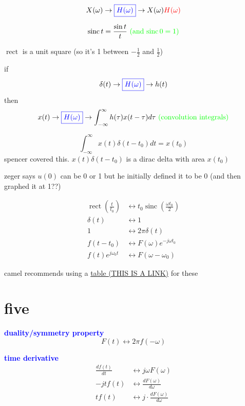 \documentclass[a5paper, fleqn]{article}
\newcommand{\vocab}[1]{\textbf{\textcolor{blue}{#1}}}
\newcommand{\emf}[1]{\textcolor{red}{#1}}
\newcommand{\note}[1]{\textcolor{green}{#1}}
\DeclareMathOperator{\sinc}{sinc}
\DeclareMathOperator{\rect}{rect}
\begin{document}
\[X(\omega) \to \vocab{$\boxed{H(\omega)}$} \to X(\omega) \emf{H(\omega)}\]

\[\sinc t = \frac{\sin t}{t} ~ \note{\text{(and $\sinc 0 = 1$)}}\]

$\rect$ is a unit square (so it's 1 between $-\frac{1}{2}$ and $\frac{1}{2}$)

if
\[\delta(t) \to \vocab{$\boxed{H(\omega)}$} \to h(t)\]
then
\[x(t) \to \vocab{$\boxed{H(\omega)}$} \to \int_{-\infty}^\infty h(\tau) x(t - \tau) d\tau ~ \note{\text{(convolution integrals)}}\]

\[\int_{-\infty}^\infty x(t) \delta(t - t_0) dt = x(t_0)\]
spencer covered this. $x(t) \delta(t - t_0)$ is a dirac delta with area $x(t_0)$

zeger says $u(0)$ can be 0 or 1 but he initially defined it to be 0 (and then graphed it at 1??)

\begin{align*}
  \rect(\frac{t}{t_0})  & \leftrightarrow t_0 \sinc(\frac{\omega t_0}{2}) \\
  \delta(t)             & \leftrightarrow 1                               \\
  1                     & \leftrightarrow 2 \pi \delta(t)                 \\
  f(t - t_0)            & \leftrightarrow F(\omega) e^{-j\omega t_0}      \\
  f(t) e^{j \omega_0 t} & \leftrightarrow F(\omega - \omega_0)
\end{align*}

camel recommends using a \href{https://ethz.ch/content/dam/ethz/special-interest/baug/ibk/structural-mechanics-dam/education/identmeth/fourier.pdf}{table (THIS IS A LINK)} for these

\section*{\textcolor{primary}{five}}

\vocab{duality/symmetry property}
\[F(t) \leftrightarrow 2\pi f(-\omega)\]

\vocab{time derivative}
\begin{align*}
  \frac{df(t)}{dt} & \leftrightarrow j\omega F(\omega)                  \\
  -jt f(t)         & \leftrightarrow \frac{dF(\omega)}{d\omega}         \\
  t f(t)           & \leftrightarrow j \cdot \frac{dF(\omega)}{d\omega}
\end{align*}
\end{document}

